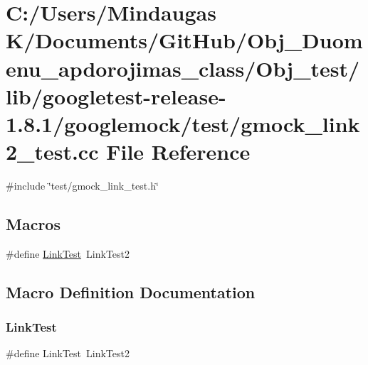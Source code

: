 \hypertarget{_obj__test_2lib_2googletest-release-1_88_81_2googlemock_2test_2gmock__link2__test_8cc}{}\section{C\+:/\+Users/\+Mindaugas K/\+Documents/\+Git\+Hub/\+Obj\+\_\+\+Duomenu\+\_\+apdorojimas\+\_\+class/\+Obj\+\_\+test/lib/googletest-\/release-\/1.8.1/googlemock/test/gmock\+\_\+link2\+\_\+test.cc File Reference}
\label{_obj__test_2lib_2googletest-release-1_88_81_2googlemock_2test_2gmock__link2__test_8cc}
{\ttfamily \#include \char`\"{}test/gmock\+\_\+link\+\_\+test.\+h\char`\"{}}\newline
\subsection*{Macros}
\begin{DoxyCompactItemize}
\item 
\#define \mbox{\hyperlink{_obj__test_2lib_2googletest-release-1_88_81_2googlemock_2test_2gmock__link2__test_8cc_afb3d3e7fd53242710a55460595d750bb}{Link\+Test}}~Link\+Test2
\end{DoxyCompactItemize}


\subsection{Macro Definition Documentation}
\mbox{\label{_obj__test_2lib_2googletest-release-1_88_81_2googlemock_2test_2gmock__link2__test_8cc_afb3d3e7fd53242710a55460595d750bb}} 
\subsubsection{\texorpdfstring{LinkTest}{LinkTest}}
{\footnotesize\ttfamily \#define Link\+Test~Link\+Test2}

